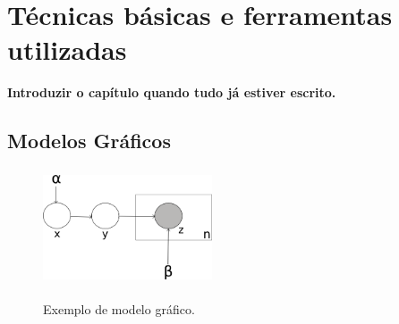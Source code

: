 \chapter{Técnicas básicas e ferramentas utilizadas}

\textbf{Introduzir o capítulo quando tudo já estiver escrito.}



\section{Modelos Gráficos}



\begin{figure}[t]
  \centering %
  \includegraphics[width=5cm, height=3.4cm]{exemplo-modelo-grafico.png}\\
  \caption{Exemplo de modelo gráfico.}
  \label{exemplo:grafico}
\end{figure}



